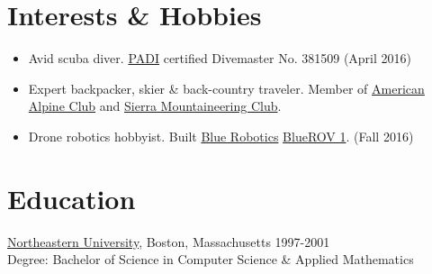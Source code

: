 \documentclass{article}
\newcommand{\resheading}[1]{\section*{#1}}
\begin{document}
\resheading{Interests \& Hobbies}

    \begin{itemize}\itemsep -2pt
        \item Avid scuba diver. \href{https://www.padi.com/}{PADI} certified Divemaster No. 381509 (April 2016)
        \item Expert backpacker, skier \& back-country traveler.\newline
        Member of \href{https://americanalpineclub.org/}{American Alpine Club} and \href{www.sierramountaineeringclub.org}{Sierra Mountaineering Club}.
        \item Drone robotics hobbyist. Built \href{http://bluerobotics.com/}{Blue Robotics} \href{https://github.com/leetbmc/bluerov}{BlueROV 1}. (Fall 2016)
    \end{itemize}

\resheading{Education}
   \href{https://www.northeastern.edu/}{Northeastern University}, Boston, Massachusetts \hfill 1997-2001\\
   Degree: Bachelor of Science in Computer Science \& Applied Mathematics\\
\end{document}
